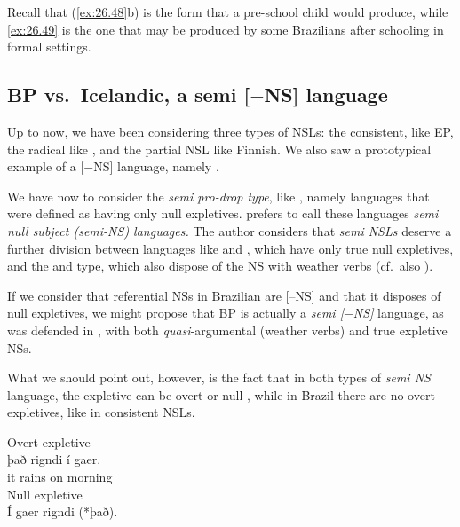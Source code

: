 \documentclass[output=paper]{langsci/langscibook}
\begin{document}
Recall that (\ref{ex:26.48}b) is the form that a pre-school child would
produce, while \eqref{ex:26.49} is the one that may be produced  by some
Brazilians after schooling in formal settings.

\subsection{BP vs.\ Icelandic, a semi [$-$NS] language}\label{sec:26.3.5}

Up to now, we have been considering three types of \gls{NSL}s: the consistent,
like \gls{EP}, the radical like , and the
partial \gls{NSL} like Finnish. We also saw a prototypical example of a [$-$NS]
language, namely .

We have now to consider the \emph{semi pro-drop type}, like ,
namely languages that were defined as having only null expletives.
\citet{Biberauer2010} prefers to call these languages \emph{semi null subject
(semi-NS) languages.} The author considers that \emph{semi NSLs} deserve a
further division between languages like  and , which
have only true null expletives, and the  and  type, which also
dispose of the NS with weather verbs (cf.\ also \citealt{Huang2000}).

If we consider that referential NSs in Brazilian  are [–NS]
and that it disposes of null expletives, we might propose that
\gls{BP} is actually a \textit{semi [$-$NS]}
language, as was defended in \citet{Saab2016}, with both
\emph{quasi}-argumental  (weather verbs) and true expletive NSs.

What we should point out, however, is the fact that in both types of
\emph{semi NS} language, the expletive can be overt or
null \citep{Biberauer2010}, while in Brazil there are no overt expletives, like
in consistent \gls{NSL}s.

\ea%
    \label{ex:26.50ice}
    \ea Overt expletive\\
    \gll    það rigndi í  gaer.\\
            it rains on morning\\
    \ex Null expletive\\
        Í gaer rigndi  (*það).
    \z
\z
\end{document}
